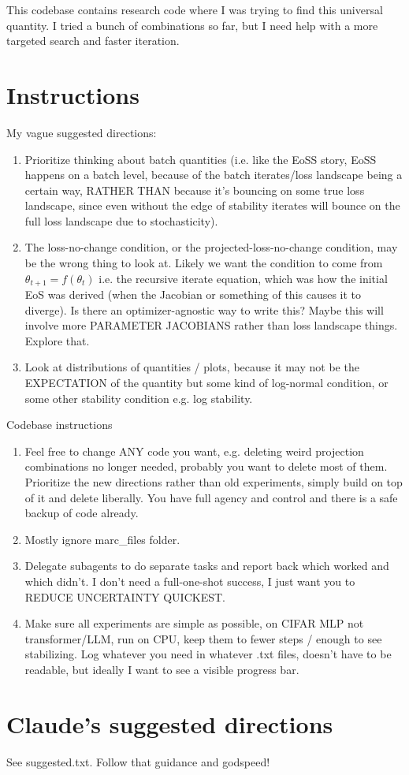 \documentclass{article}
\begin{document}
This codebase contains research code where I was trying to find this universal quantity. I tried a bunch of combinations so far, but I need help with a more targeted search and faster iteration.

\section{Instructions}

My vague suggested directions:
\begin{enumerate}
    \item Prioritize thinking about batch quantities (i.e. like the EoSS story, EoSS happens on a batch level, because of the batch iterates/loss landscape being a certain way, RATHER THAN because it's bouncing on some true loss landscape, since even without the edge of stability iterates will bounce on the full loss landscape due to stochasticity). 
    \item The loss-no-change condition, or the projected-loss-no-change condition, may be the wrong thing to look at. Likely we want the condition to come from $\theta_{t+1} = f(\theta_t)$ i.e. the recursive iterate equation, which was how the initial EoS was derived (when the Jacobian or something of this causes it to diverge). Is there an optimizer-agnostic way to write this? Maybe this will involve more PARAMETER JACOBIANS rather than loss landscape things. Explore that.
    \item Look at distributions of quantities / plots, because it may not be the EXPECTATION of the quantity but some kind of log-normal condition, or some other stability condition e.g. log stability. 
\end{enumerate}

Codebase instructions
\begin{enumerate}
    \item Feel free to change ANY code you want, e.g. deleting weird projection combinations no longer needed, probably you want to delete most of them. Prioritize the new directions rather than old experiments, simply build on top of it and delete liberally. You have full agency and control and there is a safe backup of code already.
    \item Mostly ignore marc\_files folder.
    \item Delegate subagents to do separate tasks and report back which worked and which didn't. I don't need a full-one-shot success, I just want you to REDUCE UNCERTAINTY QUICKEST.
    \item Make sure all experiments are simple as possible, on CIFAR MLP not transformer/LLM, run on CPU, keep them to fewer steps / enough to see stabilizing. Log whatever you need in whatever .txt files, doesn't have to be readable, but ideally I want to see a visible progress bar.
\end{enumerate}

\section{Claude's suggested directions}
See suggested.txt. Follow that guidance and godspeed!
\end{document}
